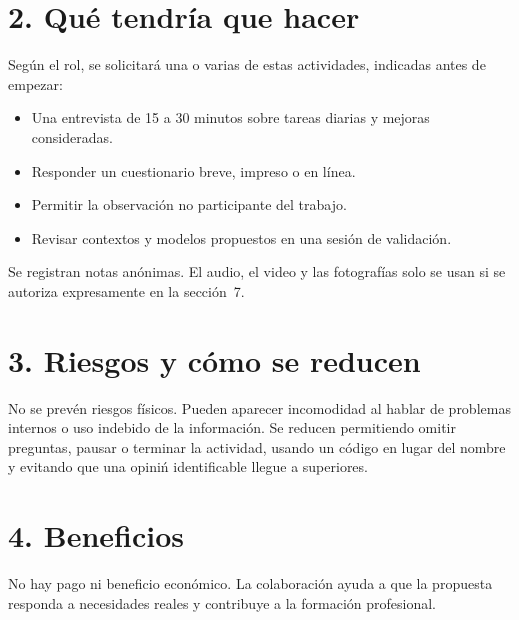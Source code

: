 \documentclass[11pt,a4paper]{article}
\begin{document}
\section*{2. Qu\'e tendr\'ia que hacer}
Seg\'un el rol, se solicitar\'a una o varias de estas actividades, indicadas antes de empezar:
\begin{itemize}[leftmargin=16pt,itemsep=1pt]
\item Una entrevista de 15 a 30 minutos sobre tareas diarias y mejoras consideradas.
\item Responder un cuestionario breve, impreso o en l\'inea.
\item Permitir la observaci\'on no participante del trabajo.
\item Revisar contextos y modelos propuestos en una sesi\'on de validaci\'on.
\end{itemize}
Se registran notas an\'onimas. El audio, el video y las fotograf\'ias solo se usan si se autoriza expresamente en la secci\'on~7.

\section*{3. Riesgos y c\'omo se reducen}
No se prev\'en riesgos f\'isicos. Pueden aparecer incomodidad al hablar de problemas internos o uso indebido de la informaci\'on. Se reducen permitiendo omitir preguntas, pausar o terminar la actividad, usando un c\'odigo en lugar del nombre y evitando que una opini\'n identificable llegue a superiores.

\section*{4. Beneficios}
No hay pago ni beneficio econ\'omico. La colaboraci\'on ayuda a que la propuesta responda a necesidades reales y contribuye a la formaci\'on profesional.
\end{document}
